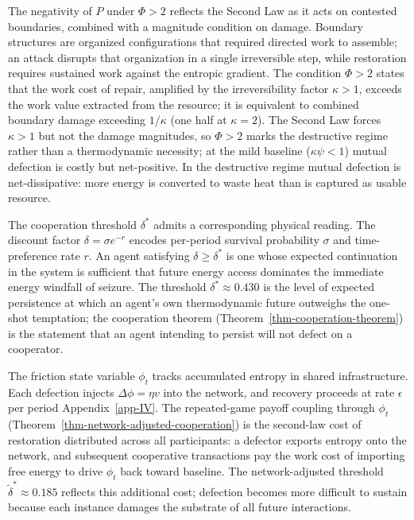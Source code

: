 \documentclass[11pt]{article}
\theoremstyle{plain}
\theoremstyle{definition}
\theoremstyle{remark}
\begin{document}
The negativity of \(P\) under \(\Phi > 2\) reflects the Second Law as it
acts on contested boundaries, combined with a magnitude condition on
damage. Boundary structures are organized configurations that required
directed work to assemble; an attack disrupts that organization in a
single irreversible step, while restoration requires sustained work
against the entropic gradient. The condition \(\Phi > 2\) states that
the work cost of repair, amplified by the irreversibility factor
\(\kappa > 1\), exceeds the work value extracted from the resource; it
is equivalent to combined boundary damage exceeding \(1/\kappa\) (one
half at \(\kappa = 2\)). The Second Law forces \(\kappa > 1\) but not
the damage magnitudes, so \(\Phi > 2\) marks the destructive regime
rather than a thermodynamic necessity; at the mild baseline
(\(\kappa\psi < 1\)) mutual defection is costly but net-positive. In the
destructive regime mutual defection is net-dissipative: more energy is
converted to waste heat than is captured as usable resource.

The cooperation threshold \(\delta^*\) admits a corresponding physical
reading. The discount factor \(\delta = \sigma e^{-r}\) encodes
per-period survival probability \(\sigma\) and time-preference rate
\(r\). An agent satisfying \(\delta \geq \delta^*\) is one whose
expected continuation in the system is sufficient that future energy
access dominates the immediate energy windfall of seizure. The threshold
\(\delta^* \approx 0.430\) is the level of expected persistence at which
an agent's own thermodynamic future outweighs the one-shot temptation;
the cooperation theorem (Theorem~\ref{thm-cooperation-theorem}) is the
statement that an agent intending to persist will not defect on a
cooperator.

The friction state variable \(\phi_t\) tracks accumulated entropy in
shared infrastructure. Each defection injects \(\Delta\phi = \eta v\)
into the network, and recovery proceeds at rate \(\epsilon\) per period
Appendix~\ref{app-IV}. The repeated-game payoff coupling through
\(\phi_t\) (Theorem~\ref{thm-network-adjusted-cooperation}) is the
second-law cost of restoration distributed across all participants: a
defector exports entropy onto the network, and subsequent cooperative
transactions pay the work cost of importing free energy to drive
\(\phi_t\) back toward baseline. The network-adjusted threshold
\(\tilde{\delta}^* \approx 0.185\) reflects this additional cost;
defection becomes more difficult to sustain because each instance
damages the substrate of all future interactions.
\end{document}
